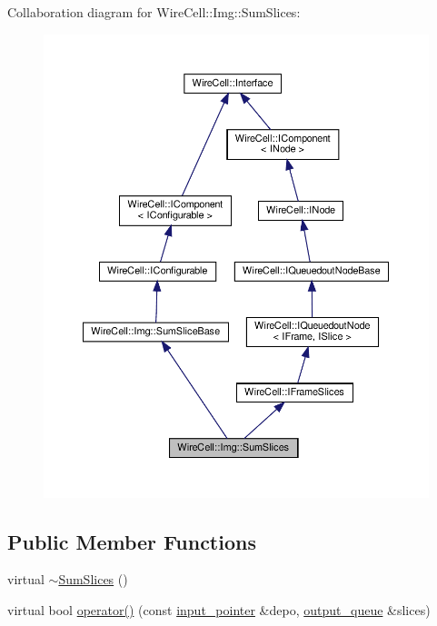 Collaboration diagram for Wire\+Cell\+:\+:Img\+:\+:Sum\+Slices\+:
\nopagebreak
\begin{figure}[H]
\begin{center}
\leavevmode
\includegraphics[width=350pt]{class_wire_cell_1_1_img_1_1_sum_slices__coll__graph}
\end{center}
\end{figure}
\subsection*{Public Member Functions}
\begin{DoxyCompactItemize}
\item 
virtual \hyperlink{class_wire_cell_1_1_img_1_1_sum_slices_a88b6109c7a28fdf1e13d4a33536f52e1}{$\sim$\+Sum\+Slices} ()
\item 
virtual bool \hyperlink{class_wire_cell_1_1_img_1_1_sum_slices_a75a674a3d5db69eef80d0d7c465c5394}{operator()} (const \hyperlink{class_wire_cell_1_1_i_queuedout_node_acf5f716a764553f3c7055a9cf67e906e}{input\+\_\+pointer} \&depo, \hyperlink{class_wire_cell_1_1_i_queuedout_node_a39018e4e3dd886befac9636ac791a685}{output\+\_\+queue} \&slices)
\end{DoxyCompactItemize}
